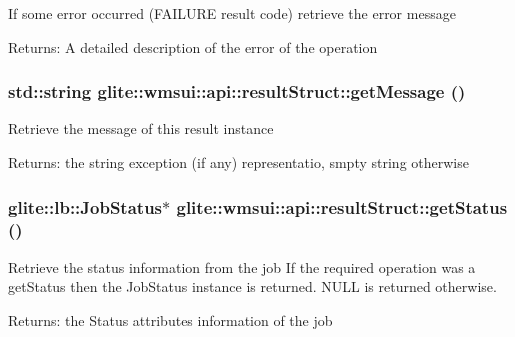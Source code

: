 If some error occurred (FAILURE result code) retrieve the error message \begin{Desc}
\item[Returns:]A detailed description of the error of the operation \end{Desc}
\hypertarget{classglite_1_1wmsui_1_1api_1_1resultStruct_a4}{
\subsubsection[getMessage]{\setlength{\rightskip}{0pt plus 5cm}std::string glite::wmsui::api::result\-Struct::get\-Message ()}}
\label{classglite_1_1wmsui_1_1api_1_1resultStruct_a4}


Retrieve the message of this result instance \begin{Desc}
\item[Returns:]the string exception (if any) representatio, smpty string otherwise\end{Desc}
\hypertarget{classglite_1_1wmsui_1_1api_1_1resultStruct_a2}{
\subsubsection[getStatus]{\setlength{\rightskip}{0pt plus 5cm}glite::lb::Job\-Status$\ast$ glite::wmsui::api::result\-Struct::get\-Status ()}}
\label{classglite_1_1wmsui_1_1api_1_1resultStruct_a2}


Retrieve the status information from the job If the required operation was a get\-Status then the Job\-Status instance is returned. NULL is returned otherwise. \begin{Desc}
\item[Returns:]the Status attributes information of the job\end{Desc}


